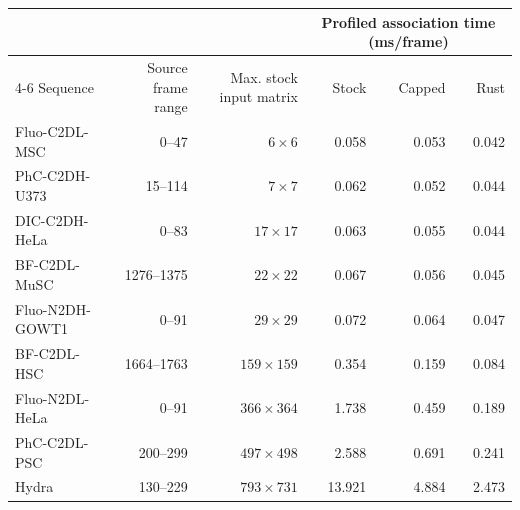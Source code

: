 \begingroup
\small
\setlength{\tabcolsep}{4pt}
\renewcommand{\arraystretch}{1.1}
\begin{tabular}{@{}lrrrrr@{}}
\toprule
 & & & \multicolumn{3}{c}{Profiled association time (ms/frame)} \\
\cmidrule(lr){4-6}
Sequence & Source frame range & Max. stock input matrix & Stock & Capped & Rust \\
\midrule
Fluo-C2DL-MSC & 0--47 & $6\times6$ & 0.058 & 0.053 & 0.042 \\
PhC-C2DH-U373 & 15--114 & $7\times7$ & 0.062 & 0.052 & 0.044 \\
DIC-C2DH-HeLa & 0--83 & $17\times17$ & 0.063 & 0.055 & 0.044 \\
BF-C2DL-MuSC & 1276--1375 & $22\times22$ & 0.067 & 0.056 & 0.045 \\
Fluo-N2DH-GOWT1 & 0--91 & $29\times29$ & 0.072 & 0.064 & 0.047 \\
BF-C2DL-HSC & 1664--1763 & $159\times159$ & 0.354 & 0.159 & 0.084 \\
Fluo-N2DL-HeLa & 0--91 & $366\times364$ & 1.738 & 0.459 & 0.189 \\
PhC-C2DL-PSC & 200--299 & $497\times498$ & 2.588 & 0.691 & 0.241 \\
Hydra & 130--229 & $793\times731$ & 13.921 & 4.884 & 2.473 \\
\bottomrule
\end{tabular}
\endgroup
